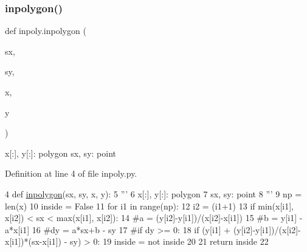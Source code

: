 \subsubsection{\texorpdfstring{inpolygon()}{inpolygon()}}
{\footnotesize\ttfamily def inpoly.\+inpolygon (\begin{DoxyParamCaption}\item[{}]{sx,  }\item[{}]{sy,  }\item[{}]{x,  }\item[{}]{y }\end{DoxyParamCaption})}

\begin{DoxyVerb}x[:], y[:]: polygon
sx, sy: point
\end{DoxyVerb}
 

Definition at line 4 of file inpoly.\+py.


\begin{DoxyCode}
4 \textcolor{keyword}{def }\hyperlink{namespaceinpoly_ac011fa801ecb6cc9429eaf02b25dd1e5}{inpolygon}(sx, sy, x, y):
5     \textcolor{stringliteral}{''' }
6 \textcolor{stringliteral}{    x[:], y[:]: polygon}
7 \textcolor{stringliteral}{    sx, sy: point}
8 \textcolor{stringliteral}{    '''}     
9     np = len(x)
10     inside = \textcolor{keyword}{False}
11     \textcolor{keywordflow}{for} i1 \textcolor{keywordflow}{in} range(np): 
12         i2 = (i1+1)%
13         \textcolor{keywordflow}{if} min(x[i1], x[i2]) < sx < max(x[i1], x[i2]):
14             \textcolor{comment}{#a = (y[i2]-y[i1])/(x[i2]-x[i1])}
15             \textcolor{comment}{#b = y[i1] - a*x[i1]}
16             \textcolor{comment}{#dy = a*sx+b - sy}
17             \textcolor{comment}{#if dy >= 0:}
18             \textcolor{keywordflow}{if} (y[i1] + (y[i2]-y[i1])/(x[i2]-x[i1])*(sx-x[i1]) - sy) > 0:
19                 inside = \textcolor{keywordflow}{not} inside
20 
21     \textcolor{keywordflow}{return} inside
22 
\end{DoxyCode}
